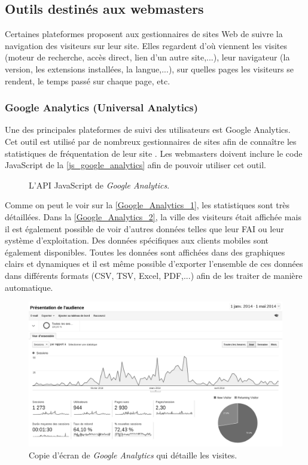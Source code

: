 \subsection{Outils destinés aux webmasters}
Certaines plateformes proposent aux gestionnaires de sites Web de suivre la navigation des visiteurs sur leur site. Elles regardent d'où viennent les visites (moteur de recherche, accès direct, lien d'un autre site,...), leur navigateur (la version, les extensions installées, la langue,...), sur quelles pages les visiteurs se rendent, le temps passé sur chaque page, etc.

\subsubsection{Google Analytics (Universal Analytics)}
\label{google_analytics}
Une des principales plateformes de suivi des utilisateurs est Google Analytics. Cet outil est utilisé par de nombreux gestionnaires de sites afin de connaître les statistiques de fréquentation de leur site \cite{javascript_google_analytics}. Les webmasters doivent inclure le code JavaScript de la \autoref{js_google_analytics} afin de pouvoir utiliser cet outil.
\newline

\begin{figure}[!h]
	\centering
	
	\caption{\label{js_google_analytics}L'API JavaScript de \textit{Google Analytics}.}
\end{figure}

Comme on peut le voir sur la \autoref{Google_Analytics_1}, les statistiques sont très détaillées. Dans la \autoref{Google_Analytics_2}, la ville des visiteurs était affichée mais il est également possible de voir d'autres données telles que leur FAI ou leur système d'exploitation. Des données spécifiques aux clients mobiles sont également disponibles. Toutes les données sont affichées dans des graphiques clairs et dynamiques et il est même possible d'exporter l'ensemble de ces données dans différents formats (CSV, TSV, Excel, PDF,...) afin de les traiter de manière automatique.

\begin{figure}[!h]
	\centering
	\includegraphics[scale=0.5]{figures/Google_Analytics_1_NB.png}
	\caption{\label{Google_Analytics_1}Copie d'écran de \textit{Google Analytics} qui détaille les visites.}
\end{figure}

